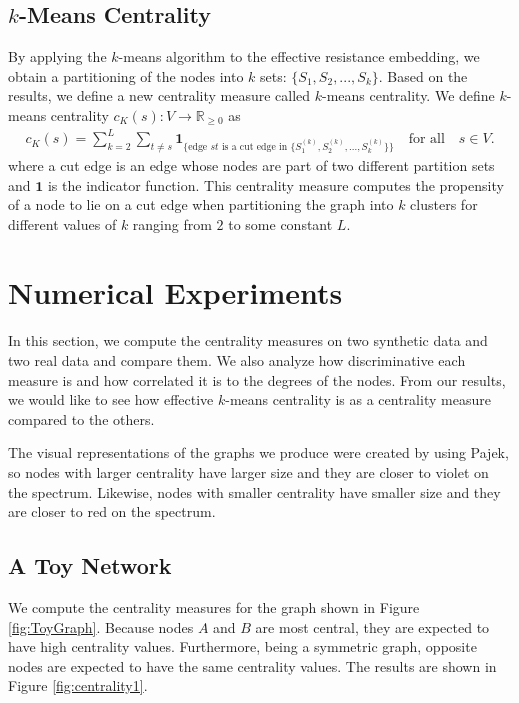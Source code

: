 \documentclass[10pt]{siamltex}
\begin{document}
\begin{pagewiselinenumbers}
\subsection{$k$-Means Centrality}
By applying the $k$-means algorithm to the effective resistance embedding, we obtain a partitioning of the nodes into $k$ sets: $\{S_1, S_2, ..., S_k\}$. Based on the results, we define a new centrality measure called $k$-means centrality. We define $k$-means centrality $c_K(s): V \rightarrow \mathbb{R}_{\geq 0}$ as 
\begin{align}
c_K(s) = \sum_{k=2}^L \sum_{t \neq s} \mathbf{1}_{\{ \textrm{edge } st \textrm{ is a cut edge in } \{S_1^{(k)}, S_2^{(k)}, ..., S_k^{(k)}\}\} } \quad \textrm{for all} \quad s \in V.
\end{align}
where a cut edge is an edge whose nodes are part of two different partition sets and $\mathbf{1}$ is the indicator function. This centrality measure computes the propensity of a node to lie on a cut edge when partitioning the graph into $k$ clusters for different values of $k$ ranging from $2$ to some constant $L$. 


\section{Numerical Experiments}  \label{sec:NumExpSyn}
In this section, we compute the centrality measures on two synthetic data and two real data and compare them. We also analyze how discriminative each measure is and how correlated it is to the degrees of the nodes. From our results, we would like to see how effective $k$-means centrality is as a centrality measure compared to the others.

The visual representations of the graphs we produce were created by using Pajek, so nodes with larger centrality have larger size and they are closer to violet on the spectrum. Likewise, nodes with smaller centrality have smaller size and they are closer to red on the spectrum.

\hfill

\subsection{A Toy Network}
We compute the centrality measures for the graph shown in Figure \ref{fig:ToyGraph}. Because nodes $A$ and $B$ are most central, they are expected to have high centrality values. Furthermore, being a symmetric graph, opposite nodes are expected to have the same centrality values. The results are shown in Figure \ref{fig:centrality1}.


\end{pagewiselinenumbers}
\end{document}
